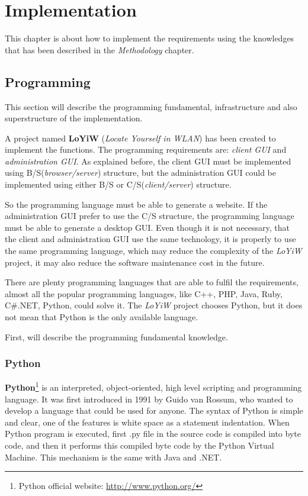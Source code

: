 \newpage
\chapter{Implementation}

This chapter is about how to implement the requirements using the knowledges that has been described in the \textit{Methodology} chapter.

\section{Programming}

This section will describe the programming fundamental, infrastructure and also superstructure of the implementation. 

A project named \textbf{LoYiW} (\textit{Locate Yourself in WLAN}) has been created to implement the functions. The programming requirements are: \textit{client GUI} and \textit{administration GUI}. As explained before, the client GUI must be implemented using B/S(\textit{browser/server}) structure, but the administration GUI could be implemented using either B/S or C/S(\textit{client/server}) structure. 

So the programming language must be able to generate a website. If the administration GUI prefer to use the C/S structure, the programming language must be able to generate a desktop GUI. Even though it is not necessary, that the client and administration GUI use the same technology, it is properly to use the same programming language, which may reduce the complexity of the \textit{LoYiW} project, it may also reduce the software maintenance cost in the future.

There are plenty programming languages that are able to fulfil the requirements, almost all the popular programming languages, like C++, PHP, Java, Ruby, C\#.NET, Python, could solve it. The \textit{LoYiW} project chooses Python, but it does not mean that Python is the only available language.

First, will describe the programming fundamental knowledge.

\subsection{Python}

\textbf{Python}\footnote{Python official website: \url{http://www.python.org/}} is an interpreted, object-oriented, high level scripting and programming language. It was first introduced in 1991 by Guido van Rossum, who wanted to develop a language that could be used for anyone. The syntax of Python is simple and clear, one of the features is white space as a statement indentation. When Python program is executed, first .py file in the source code is compiled into byte code, and then it performs this compiled byte code by the Python Virtual Machine. This mechanism is the same with Java and .NET.  

